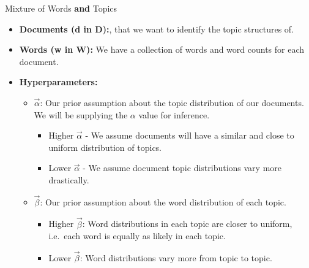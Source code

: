 \documentclass[
  ignorenonframetext,
]{beamer}
\providecommand{\tightlist}{%
  \setlength{\itemsep}{0pt}\setlength{\parskip}{0pt}}
\begin{document}
\begin{frame}{Mixture of Words \textbf{and} Topics}
\protect\hypertarget{mixture-of-words-and-topics}{}

\footnotesize

\begin{itemize}
\tightlist
\item
  \textbf{Documents (d in D):}, that we want to identify the topic
  structures of.
\item
  \textbf{Words (w in W):} We have a collection of words and word counts
  for each document.
\item
  \textbf{Hyperparameters:}

  \begin{itemize}
  \tightlist
  \item
    \(\overrightarrow{\alpha}\): Our prior assumption about the topic
    distribution of our documents. We will be supplying the \(\alpha\)
    value for inference.

    \begin{itemize}
    \tightlist
    \item
      Higher \(\overrightarrow{\alpha}\) - We assume documents will have
      a similar and close to uniform distribution of topics.
    \item
      Lower \(\overrightarrow{\alpha}\) - We assume document topic
      distributions vary more drastically.
    \end{itemize}
  \item
    \(\overrightarrow{\beta}\): Our prior assumption about the word
    distribution of each topic.

    \begin{itemize}
    \tightlist
    \item
      Higher \(\overrightarrow{\beta}\): Word distributions in each
      topic are closer to uniform, i.e.~each word is equally as likely
      in each topic.
    \item
      Lower \(\overrightarrow{\beta}\): Word distributions vary more
      from topic to topic.
    \end{itemize}
  \end{itemize}
\end{itemize}

\end{frame}
\end{document}
